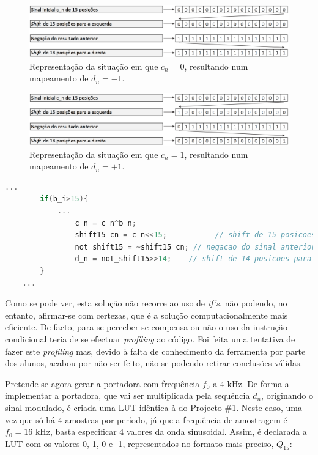 \documentclass[11pt]{article}
\numberwithin{equation}{section}
\begin{document}
\begin{figure}[H]
	\centering
	\includegraphics[keepaspectratio=true, scale=0.30]{teoricas/esquema2}
	\caption{Representação da situação em que $c_{n} = 0$, resultando num mapeamento de $d_{n} = -1$.}
	\vspace{-0.8em}
\end{figure}

\begin{figure}[H]
	\centering
	\includegraphics[keepaspectratio=true, scale=0.30]{teoricas/esquema1}
	\caption{Representação da situação em que $c_{n} = 1$, resultando num mapeamento de $d_{n} = +1$.}
	\vspace{-0.8em}
\end{figure}

\begin{lstlisting}[language=C]
	...
		if(b_i>15){
			...
				c_n = c_n^b_n;
				shift15_cn = c_n<<15;	   		// shift de 15 posicoes para a esquerda
				not_shift15 = ~shift15_cn; // negacao do sinal anterior 
				d_n = not_shift15>>14;    // shift de 14 posicoes para a direita
		}
	...
\end{lstlisting}

Como se pode ver, esta solução não recorre ao uso de \textit{if's}, não podendo, no entanto, afirmar-se com certezas, que é a solução computacionalmente mais eficiente. De facto, para se perceber se compensa ou não o uso da instrução condicional teria de se efectuar \textit{profiling} ao código. Foi feita uma tentativa de fazer este \textit{profiling} mas, devido à falta de conhecimento da ferramenta por parte dos alunos, acabou por não ser feito, não se podendo retirar conclusões válidas.

Pretende-se agora gerar a portadora com frequência $f_0$  a 4 kHz. De forma a implementar a portadora, que vai ser multiplicada pela sequência $d_n$, originando o sinal modulado, é criada uma LUT idêntica à do Projecto \#1. Neste caso, uma vez que só há 4 amostras por período, já que a frequência de amostragem é 
$f_0 = 16$ kHz, basta especificar 4 valores da onda sinusoidal. Assim, é declarada a LUT com os valores 0, 1, 0 e -1, representados no formato mais preciso, $Q_{15}$:
\end{document}
